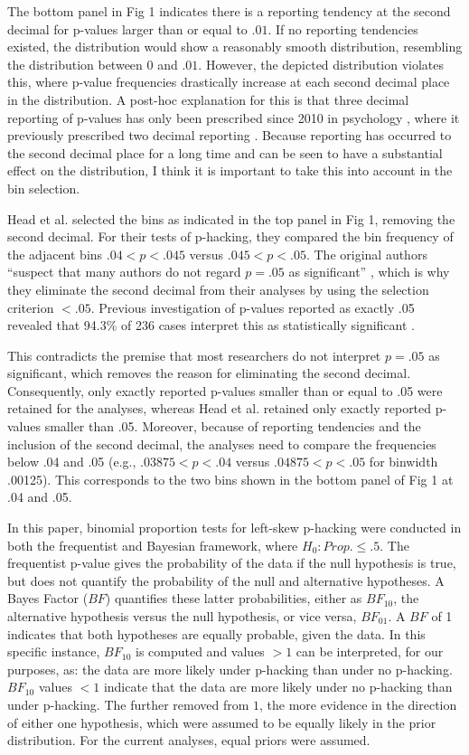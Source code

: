 The bottom panel in Fig 1 indicates there is a reporting tendency at the second decimal for p-values larger than or equal to $.01$. If no reporting tendencies existed, the distribution would show a reasonably smooth distribution, resembling the distribution between $0$ and $.01$. However, the depicted distribution violates this, where p-value frequencies drastically increase at each second decimal place in the distribution. A post-hoc explanation for this is that three decimal reporting of p-values has only been prescribed since 2010 in psychology \cite{American_Psychological_Association2010-qe}, where it previously prescribed two decimal reporting \cite{American_Psychological_Association1983-yf, American_Psychological_Association2001-uw}. Because reporting has occurred to the second decimal place for a long time and can be seen to have a substantial effect on the distribution, I think it is important to take this into account in the bin selection.

Head et al. selected the bins as indicated in the top panel in Fig 1, removing the second decimal. For their tests of p-hacking, they compared the bin frequency of the adjacent bins $.04<p<.045$ versus $.045<p<.05$. The original authors “suspect that many authors do not regard $p=.05$ as significant” \cite{Head_2015}, which is why they eliminate the second decimal from their analyses by using the selection criterion $<.05$. Previous investigation of p-values reported as exactly .05 revealed that 94.3\% of 236 cases interpret this as statistically significant \cite{Nuijten2015}.

This contradicts the premise that most researchers do not interpret $p=.05$ as significant, which removes the reason for eliminating the second decimal. Consequently, only exactly reported p-values smaller than or equal to .05 were retained for the analyses, whereas Head et al. retained only exactly reported p-values smaller than .05. Moreover, because of reporting tendencies and the inclusion of the second decimal, the analyses need to compare the frequencies below .04 and .05 (e.g., $.03875<p<.04$ versus $.04875<p<.05$ for binwidth .00125). This corresponds to the two bins shown in the bottom panel of Fig 1 at .04 and .05.

In this paper, binomial proportion tests for left-skew p-hacking were conducted in both the frequentist and Bayesian framework, where $H_0:Prop.\leq.5$. The frequentist p-value gives the probability of the data if the null hypothesis is true, but does not quantify the probability of the null and alternative hypotheses. A Bayes Factor ($BF$) quantifies these latter probabilities, either as $BF_{10}$, the alternative hypothesis versus the null hypothesis, or vice versa, $BF_{01}$. A $BF$ of 1 indicates that both hypotheses are equally probable, given the data. In this specific instance, $BF_{10}$ is computed and values $>1$ can be interpreted, for our purposes, as: the data are more likely under p-hacking than under no p-hacking. $BF_{10}$ values $<1$ indicate that the data are more likely under no p-hacking than under p-hacking. The further removed from $1$, the more evidence in the direction of either one hypothesis, which were assumed to be equally likely in the prior distribution. For the current analyses, equal priors were assumed.